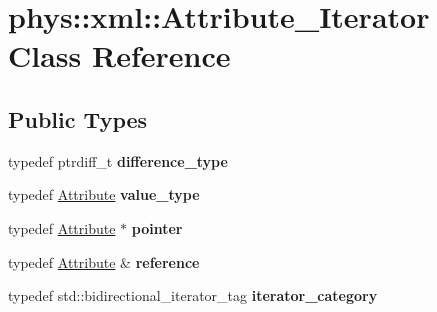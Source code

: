 \hypertarget{classphys_1_1xml_1_1Attribute__Iterator}{
\section{phys::xml::Attribute\_\-Iterator Class Reference}
\label{da/d4f/classphys_1_1xml_1_1Attribute__Iterator}
}
\subsection*{Public Types}
\begin{DoxyCompactItemize}
\item 
\hypertarget{classphys_1_1xml_1_1Attribute__Iterator_a35a592a17dfc0bbe4e3faa36fdc76fd5}{
typedef ptrdiff\_\-t {\bfseries difference\_\-type}}
\label{da/d4f/classphys_1_1xml_1_1Attribute__Iterator_a35a592a17dfc0bbe4e3faa36fdc76fd5}

\item 
\hypertarget{classphys_1_1xml_1_1Attribute__Iterator_a9fbf937df3016c1d046d390eaec3e1a1}{
typedef \hyperlink{classphys_1_1xml_1_1Attribute}{Attribute} {\bfseries value\_\-type}}
\label{da/d4f/classphys_1_1xml_1_1Attribute__Iterator_a9fbf937df3016c1d046d390eaec3e1a1}

\item 
\hypertarget{classphys_1_1xml_1_1Attribute__Iterator_a80d18224605176fc822de748e7b3d61f}{
typedef \hyperlink{classphys_1_1xml_1_1Attribute}{Attribute} $\ast$ {\bfseries pointer}}
\label{da/d4f/classphys_1_1xml_1_1Attribute__Iterator_a80d18224605176fc822de748e7b3d61f}

\item 
\hypertarget{classphys_1_1xml_1_1Attribute__Iterator_a6eb25987fc650861cd2b0e47bb7371bc}{
typedef \hyperlink{classphys_1_1xml_1_1Attribute}{Attribute} \& {\bfseries reference}}
\label{da/d4f/classphys_1_1xml_1_1Attribute__Iterator_a6eb25987fc650861cd2b0e47bb7371bc}

\item 
\hypertarget{classphys_1_1xml_1_1Attribute__Iterator_a215c89d8bc538e05fe999a94346b106a}{
typedef std::bidirectional\_\-iterator\_\-tag {\bfseries iterator\_\-category}}
\label{da/d4f/classphys_1_1xml_1_1Attribute__Iterator_a215c89d8bc538e05fe999a94346b106a}

\end{DoxyCompactItemize}
